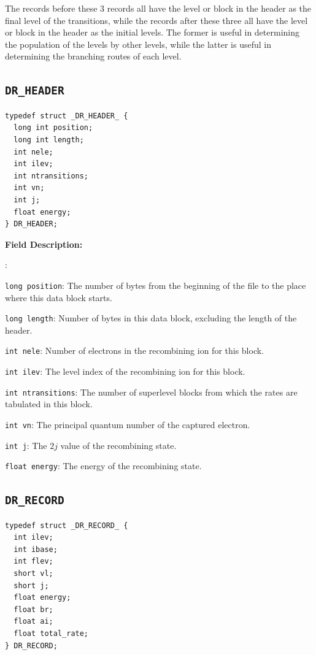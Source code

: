 \documentclass[twoside,letterpaper]{refrep}
\newenvironment{dbdesc}{\textbf{Field Description:} \begin{list}
	{:}{\setlength{\labelwidth}{2in}
	   \setlength{\leftmargin}{2in}
	   \setlength{\labelsep}{0.1in}
	   \setlength{\rightmargin}{0.2in}}}
	{\end{list}}
\begin{document}
The records before these 3 records all have the level or block in the header
as the final level of the transitions, while the records after these three all
have the level or block in the header as the initial levels. The former is
useful in determining the population of the levels by other levels, while the
latter is useful in determining the branching routes of each level.

\subsection{\texttt{DR\_HEADER}}
\begin{verbatim}	
typedef struct _DR_HEADER_ {
  long int position;
  long int length;
  int nele;
  int ilev;
  int ntransitions;
  int vn;
  int j;
  float energy;
} DR_HEADER;
\end{verbatim}

\begin{dbdesc}
\item[\texttt{long position}:] The number of bytes from the beginning of the
file to the place where this data block starts.
\item[\texttt{long length}:] Number of bytes in this data block, excluding the
length of the header.
\item[\texttt{int nele}:] Number of electrons in the recombining ion for this
block. 
\item[\texttt{int ilev}:] The level index of the recombining ion for this
block. 
\item[\texttt{int ntransitions}:] The number of superlevel blocks from which
the rates are tabulated in this block.
\item[\texttt{int vn}:] The principal quantum number of the captured electron.
\item[\texttt{int j}:] The $2j$ value of the recombining state.
\item[\texttt{float energy}:] The energy of the recombining state.
\end{dbdesc}

\subsection{\texttt{DR\_RECORD}}
\begin{verbatim}
typedef struct _DR_RECORD_ {
  int ilev;
  int ibase;
  int flev;
  short vl;
  short j;
  float energy;
  float br;
  float ai;
  float total_rate;
} DR_RECORD;
\end{verbatim}
\end{document}

